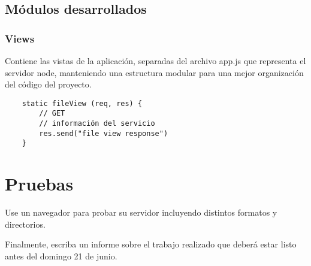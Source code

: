 \documentclass[11pt]{article}
\begin{document}
\subsection{Módulos desarrollados}
\label{sec:org1f60753}

\subsubsection{Views}
\label{sec:org8426448}
Contiene las vistas de la aplicación, separadas del archivo app.js que representa el servidor node,
manteniendo una estructura modular para una mejor organización del código del proyecto.

\begin{verbatim}
    static fileView (req, res) {
        // GET
        // información del servicio
        res.send("file view response")
    }
\end{verbatim}

\section{Pruebas}
\label{sec:org8f2dce6}
Use un navegador para probar su servidor incluyendo distintos formatos y directorios.

Finalmente, escriba un informe sobre el trabajo realizado que deberá estar listo antes del domingo 21 de junio.
\end{document}

